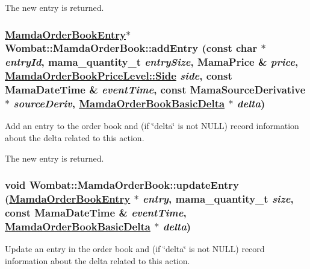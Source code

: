 The new entry is returned. \hypertarget{classWombat_1_1MamdaOrderBook_3d6ad8b2327a1211e57417fc1b08c373}{
\subsubsection[addEntry]{\setlength{\rightskip}{0pt plus 5cm}\hyperlink{classWombat_1_1MamdaOrderBookEntry}{Mamda\-Order\-Book\-Entry}$\ast$ Wombat::Mamda\-Order\-Book::add\-Entry (const char $\ast$ {\em entry\-Id}, mama\_\-quantity\_\-t {\em entry\-Size}, Mama\-Price \& {\em price}, \hyperlink{classWombat_1_1MamdaOrderBookPriceLevel_384c34b0a74d874b8969dee9b0d3718d}{Mamda\-Order\-Book\-Price\-Level::Side} {\em side}, const Mama\-Date\-Time \& {\em event\-Time}, const Mama\-Source\-Derivative $\ast$ {\em source\-Deriv}, \hyperlink{classWombat_1_1MamdaOrderBookBasicDelta}{Mamda\-Order\-Book\-Basic\-Delta} $\ast$ {\em delta})}}
\label{classWombat_1_1MamdaOrderBook_3d6ad8b2327a1211e57417fc1b08c373}


Add an entry to the order book and (if \char`\"{}delta\char`\"{} is not NULL) record information about the delta related to this action. 

The new entry is returned. \hypertarget{classWombat_1_1MamdaOrderBook_f07133227a07a953db03a055233388a8}{
\subsubsection[updateEntry]{\setlength{\rightskip}{0pt plus 5cm}void Wombat::Mamda\-Order\-Book::update\-Entry (\hyperlink{classWombat_1_1MamdaOrderBookEntry}{Mamda\-Order\-Book\-Entry} $\ast$ {\em entry}, mama\_\-quantity\_\-t {\em size}, const Mama\-Date\-Time \& {\em event\-Time}, \hyperlink{classWombat_1_1MamdaOrderBookBasicDelta}{Mamda\-Order\-Book\-Basic\-Delta} $\ast$ {\em delta})}}
\label{classWombat_1_1MamdaOrderBook_f07133227a07a953db03a055233388a8}


Update an entry in the order book and (if \char`\"{}delta\char`\"{} is not NULL) record information about the delta related to this action. 

